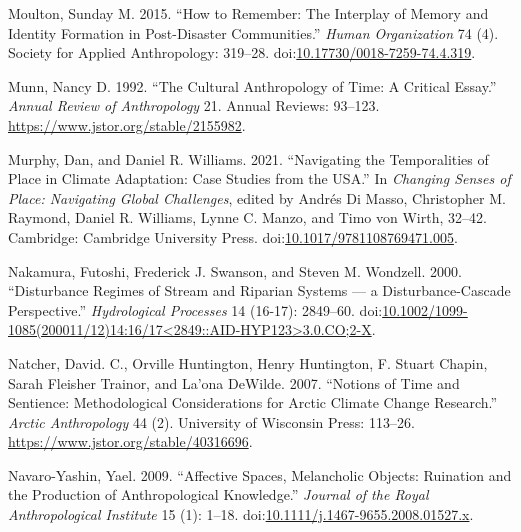 \documentclass[
]{article}
\newlength{\cslhangindent}
\newenvironment{CSLReferences}[2] %
 {\begin{list}{}{%
  \setlength{\itemindent}{0pt}
  \setlength{\leftmargin}{0pt}
  \setlength{\parsep}{0pt}
  \ifodd #1
   \setlength{\leftmargin}{\cslhangindent}
   \setlength{\itemindent}{-1\cslhangindent}
  \fi
  \setlength{\itemsep}{#2\baselineskip}}}
 {\end{list}}
\begin{document}
\begin{CSLReferences}{1}{0}
Moulton, Sunday M. 2015. {``How to Remember: {The} Interplay of Memory and Identity Formation in Post-Disaster Communities.''} \emph{Human Organization} 74 (4). Society for Applied Anthropology: 319--28. doi:\href{https://doi.org/10.17730/0018-7259-74.4.319}{10.17730/0018-7259-74.4.319}.

Munn, Nancy D. 1992. {``The {Cultural Anthropology} of {Time}: {A Critical Essay}.''} \emph{Annual Review of Anthropology} 21. Annual Reviews: 93--123. \url{https://www.jstor.org/stable/2155982}.

Murphy, Dan, and Daniel R. Williams. 2021. {``Navigating the {Temporalities} of {Place} in {Climate Adaptation}: {Case Studies} from the {USA}.''} In \emph{Changing {Senses} of {Place}: {Navigating Global Challenges}}, edited by Andrés Di Masso, Christopher M. Raymond, Daniel R. Williams, Lynne C. Manzo, and Timo von Wirth, 32--42. Cambridge: Cambridge University Press. doi:\href{https://doi.org/10.1017/9781108769471.005}{10.1017/9781108769471.005}.

Nakamura, Futoshi, Frederick J. Swanson, and Steven M. Wondzell. 2000. {``Disturbance Regimes of Stream and Riparian Systems --- a Disturbance-Cascade Perspective.''} \emph{Hydrological Processes} 14 (16-17): 2849--60. doi:\href{https://doi.org/10.1002/1099-1085(200011/12)14:16/17\%3C2849::AID-HYP123\%3E3.0.CO;2-X}{10.1002/1099-1085(200011/12)14:16/17\textless2849::AID-HYP123\textgreater3.0.CO;2-X}.

Natcher, David. C., Orville Huntington, Henry Huntington, F. Stuart Chapin, Sarah Fleisher Trainor, and La'ona DeWilde. 2007. {``Notions of {Time} and {Sentience}: {Methodological Considerations} for {Arctic Climate Change Research}.''} \emph{Arctic Anthropology} 44 (2). University of Wisconsin Press: 113--26. \url{https://www.jstor.org/stable/40316696}.

Navaro-Yashin, Yael. 2009. {``Affective Spaces, Melancholic Objects: {Ruination} and the Production of Anthropological Knowledge.''} \emph{Journal of the Royal Anthropological Institute} 15 (1): 1--18. doi:\href{https://doi.org/10.1111/j.1467-9655.2008.01527.x}{10.1111/j.1467-9655.2008.01527.x}.


\end{CSLReferences}
\end{document}

